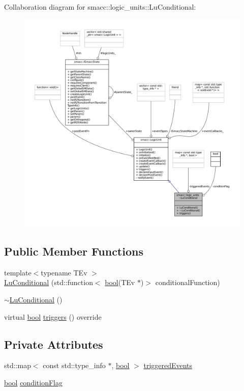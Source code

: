 Collaboration diagram for smacc\+:\+:logic\+\_\+units\+:\+:Lu\+Conditional\+:
\nopagebreak
\begin{figure}[H]
\begin{center}
\leavevmode
\includegraphics[width=350pt]{classsmacc_1_1logic__units_1_1LuConditional__coll__graph}
\end{center}
\end{figure}
\subsection*{Public Member Functions}
\begin{DoxyCompactItemize}
\item 
{\footnotesize template$<$typename T\+Ev $>$ }\\\hyperlink{classsmacc_1_1logic__units_1_1LuConditional_a7e0cbc05104737037377b50371db5622}{Lu\+Conditional} (std\+::function$<$ \hyperlink{classbool}{bool}(T\+Ev $\ast$)$>$ conditional\+Function)
\item 
\hyperlink{classsmacc_1_1logic__units_1_1LuConditional_aff598f2b1271d15d06a309226145b241}{$\sim$\+Lu\+Conditional} ()
\item 
virtual \hyperlink{classbool}{bool} \hyperlink{classsmacc_1_1logic__units_1_1LuConditional_a6d2a5faf4a5fe8f7c9e2e3fdbc481f97}{triggers} () override
\end{DoxyCompactItemize}
\subsection*{Private Attributes}
\begin{DoxyCompactItemize}
\item 
std\+::map$<$ const std\+::type\+\_\+info $\ast$, \hyperlink{classbool}{bool} $>$ \hyperlink{classsmacc_1_1logic__units_1_1LuConditional_a506a426f93e02267406fa318dd370bf1}{triggered\+Events}
\item 
\hyperlink{classbool}{bool} \hyperlink{classsmacc_1_1logic__units_1_1LuConditional_a3467d1cd6e1801f892dbf8702539a707}{condition\+Flag}
\end{DoxyCompactItemize}

